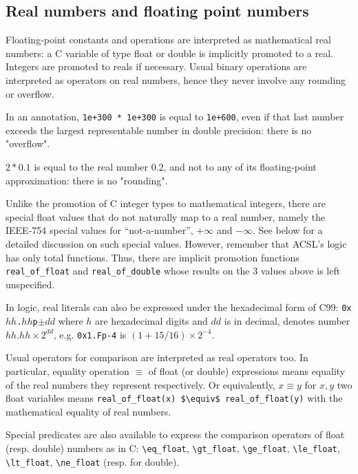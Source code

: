\subsection{Real numbers and floating point numbers}
\label{sec:floating-point}

Floating-point constants and operations are interpreted as
mathematical real numbers: a C variable of type float or double is
implicitly promoted to a real. Integers are promoted to reals if
necessary. Usual binary operations are interpreted as operators on
real numbers, hence they never involve any rounding or overflow.

\begin{example}
  In an annotation, \lstinline|1e+300 * 1e+300| is equal to
  \lstinline|1e+600|, even if that last number exceeds the largest
  representable number in double precision: there is no "overflow".

  $2 * 0.1$ is equal to the real number $0.2$, and not to any of its
  floating-point approximation: there is no "rounding".
\end{example}
Unlike the promotion of C integer types to mathematical integers,
there are special float values that do not naturally map to a real
number, namely the IEEE-754 special values for ``not-a-number'',
$+\infty$ and $-\infty$. See below for a detailed discussion on such
special values. However, remember that ACSL's logic has only total
functions. Thus, there are implicit promotion functions
\lstinline|real_of_float| and
\lstinline|real_of_double| whose results on
the 3 values above is left unspecified.

In logic, real literals can also be expressed under the hexadecimal
form of C99: \texttt{0x$hh$.$hh$p$\pm{}dd$} where $h$ are hexadecimal
digits and $dd$ is in decimal, denotes number $hh.hh\times
2^{dd}$, e.g. \texttt{0x1.Fp-4} is $(1+15/16)\times 2^{-4}$.


Usual operators for comparison are interpreted as real operators
too. In particular, equality operation $\equiv$ of float (or double)
expressions means equality of the real numbers they represent
respectively. Or equivalently, $x \equiv y$ for $x,y$ two float
variables means \lstinline|real_of_float(x) $\equiv$ real_of_float(y)|
with the mathematical equality of real
numbers.


Special predicates are also available to express the comparison
operators of float (resp. double) numbers as in C:
\lstinline|\eq_float|,
\lstinline|\gt_float|,
\lstinline|\ge_float|,
\lstinline|\le_float|,
\lstinline|\lt_float|,
\lstinline|\ne_float|
(resp. for double).



